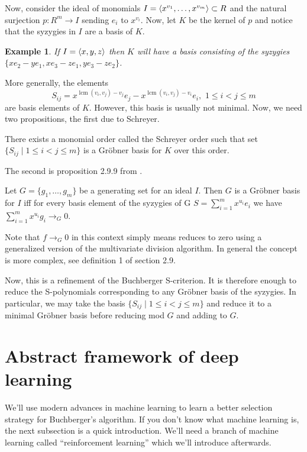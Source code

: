 \documentclass{article}
\theoremstyle{changedot}
\theoremstyle{changedotbreak}
\theoremstyle{nonumberplain}
\newtheorem{example}{Example}
\DeclarePairedDelimiter{\tuple}{\langle}{\rangle}
\DeclareMathOperator{\lcm}{lcm}
\begin{document}
Now, consider the ideal of monomials $I = \tuple{x^{v_{1}}, \dots, x^{v_{m}}} \subset R$ and the natural surjection $p : R^{m} \to I$ sending $e_{i}$ to $x^{v_{i}}$. Now, let $K$ be the kernel of $p$ and notice that the syzygies in $I$ are a basis of $K$.

\begin{example}
If $I = \tuple{x, y, z}$ then $K$ will have a basis consisting of the syzygies $\{x e_{2} - y e_{1}, x e_{3} - z e_{1}, y e_{3} - z e_{2}\}$. 
\end{example}

More generally, the elements \[S_{ij} = x^{\lcm(v_{i}, v_{j}) - v_{j}} e_{j} - x^{\lcm(v_{i}, v_{j}) - v_{i}} e_{i}, \, \, 1 \leq i < j \leq m\] are basis elements of $K$. However, this basis is usually not minimal. Now, we need two propositions, the first due to Schreyer.

\begin{theorem}
 There exists a monomial order called the Schreyer order such that set $\{S_{ij} \mid 1 \leq i < j \leq m\}$ is a Gröbner basis for $K$ over this order.
\end{theorem}

The second is proposition 2.9.9 from \cite{IVA}.

\begin{theorem}
  Let $G = \{g_{1}, \dots, g_{m}\}$ be a generating set for an ideal $I$. Then $G$ is a Gröbner basis for $I$ iff for every basis element of the syzygies of G $S = \sum_{i = 1}^{m} x^{u_{i}} e_{i}$ we have $\sum_{i=1}^{m} x^{u_{i}} g_{i} \to_{G} 0$.
\end{theorem}

Note that $f \to_{G} 0$ in this context simply means reduces to zero using a generalized version of the multivariate division algorithm. In general the concept is more complex, see \cite{IVA} definition 1 of section 2.9.

Now, this is a refinement of the Buchberger S-criterion. It is therefore enough to reduce the S-polynomials corresponding to any Gröbner basis of the syzygies. In particular, we may take the basis $\{S_{ij} \mid 1 \leq i < j \leq m\}$ and reduce it to a minimal Gröbner basis before reducing mod $G$ and adding to $G$.


\section{Abstract framework of deep learning}

We'll use modern advances in machine learning to learn a better selection strategy for Buchberger's algorithm. If you don't know what machine learning is, the next subsection is a quick introduction. We'll need a branch of machine learning called ``reinforcement learning'' which we'll introduce afterwards.
\end{document}
